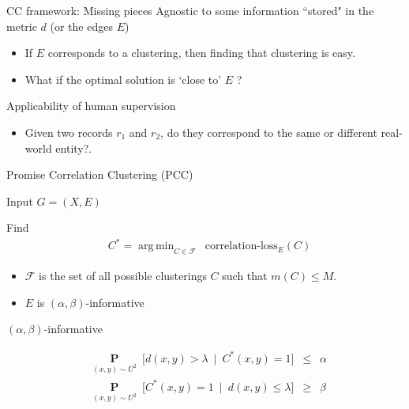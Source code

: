 \documentclass{beamer}
\newcommand{\mc}{\mathcal}
\newcommand{\mb}{\mathbf}
\DeclareMathOperator*{\argmin}{arg\,min}
\begin{document}
\begin{frame}{CC framework: Missing pieces}
	Agnostic to some information ``stored" in the metric $d$ (or the edges $E$)
    \begin{itemize}
    	\vspace{10pt}\item If $E$ corresponds to a clustering, then finding that clustering is easy.\\
    	\vspace{10pt}\item What if the optimal solution is `close to' $E$ ? 
	\end{itemize}
	
	\vspace{20pt}Applicability of human supervision
	\begin{itemize}
    	\vspace{10pt}\item Given two records $r_1$ and $r_2$, do they correspond to the same or different real-world entity?.
	\end{itemize}
\end{frame}

\begin{frame}{Promise Correlation Clustering (PCC)}
	\begin{block}{Input}
		$G = (X, E)$
	\end{block}
	
	\begin{block}{Find}
	\vspace{-15pt}\begin{align*}
	  &C^* = \argmin_{C \in \mc F} \enspace \text{correlation-loss}_{E}(C) \label{eqn:promiseCorrLoss}
	\end{align*}
	
	\vspace{-10pt}\begin{itemize}
		\item $\mc F$ is the set of all possible clusterings $C$ such that $m(C) \le M$.
		\item $E$ is $(\alpha, \beta)$-informative
	\end{itemize}		
	\end{block}
	
	\begin{block}{$(\alpha, \beta)$-informative}
		
		\vspace{-10pt}\begin{align*}
			&\underset{(x, y) \sim U^2}{\mb P}\enspace \big[ d(x, y) > \lambda \enspace|\enspace C^*(x, y) = 1\big] \enspace \le \enspace \alpha \\
			&\underset{(x, y) \sim U^2}{\mb P}\enspace \big[C^*(x, y) = 1 \enspace|\enspace d(x, y) \le \lambda \big] \enspace \ge \enspace \beta 
		\end{align*}
	\end{block}	
\end{frame}
\end{document}
